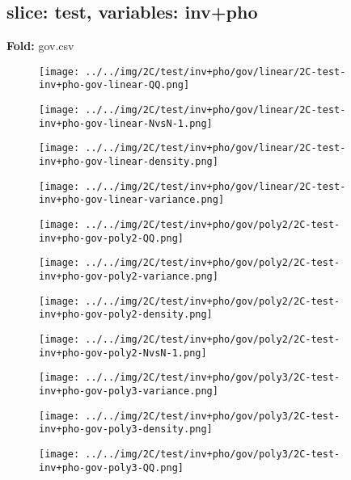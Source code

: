 \subsection{slice: test, variables: inv+pho}
\textbf{Fold:} gov.csv
\begin{figure}[H]
\centering	\texttt{[image: ../../img/2C/test/inv+pho/gov/linear/2C-test-inv+pho-gov-linear-QQ.png]}
\end{figure}
\begin{figure}[H]
\centering	\texttt{[image: ../../img/2C/test/inv+pho/gov/linear/2C-test-inv+pho-gov-linear-NvsN-1.png]}
\end{figure}
\begin{figure}[H]
\centering	\texttt{[image: ../../img/2C/test/inv+pho/gov/linear/2C-test-inv+pho-gov-linear-density.png]}
\end{figure}
\begin{figure}[H]
\centering	\texttt{[image: ../../img/2C/test/inv+pho/gov/linear/2C-test-inv+pho-gov-linear-variance.png]}
\end{figure}
\begin{figure}[H]
\centering	\texttt{[image: ../../img/2C/test/inv+pho/gov/poly2/2C-test-inv+pho-gov-poly2-QQ.png]}
\end{figure}
\begin{figure}[H]
\centering	\texttt{[image: ../../img/2C/test/inv+pho/gov/poly2/2C-test-inv+pho-gov-poly2-variance.png]}
\end{figure}
\begin{figure}[H]
\centering	\texttt{[image: ../../img/2C/test/inv+pho/gov/poly2/2C-test-inv+pho-gov-poly2-density.png]}
\end{figure}
\begin{figure}[H]
\centering	\texttt{[image: ../../img/2C/test/inv+pho/gov/poly2/2C-test-inv+pho-gov-poly2-NvsN-1.png]}
\end{figure}
\begin{figure}[H]
\centering	\texttt{[image: ../../img/2C/test/inv+pho/gov/poly3/2C-test-inv+pho-gov-poly3-variance.png]}
\end{figure}
\begin{figure}[H]
\centering	\texttt{[image: ../../img/2C/test/inv+pho/gov/poly3/2C-test-inv+pho-gov-poly3-density.png]}
\end{figure}
\begin{figure}[H]
\centering	\texttt{[image: ../../img/2C/test/inv+pho/gov/poly3/2C-test-inv+pho-gov-poly3-QQ.png]}
\end{figure}
